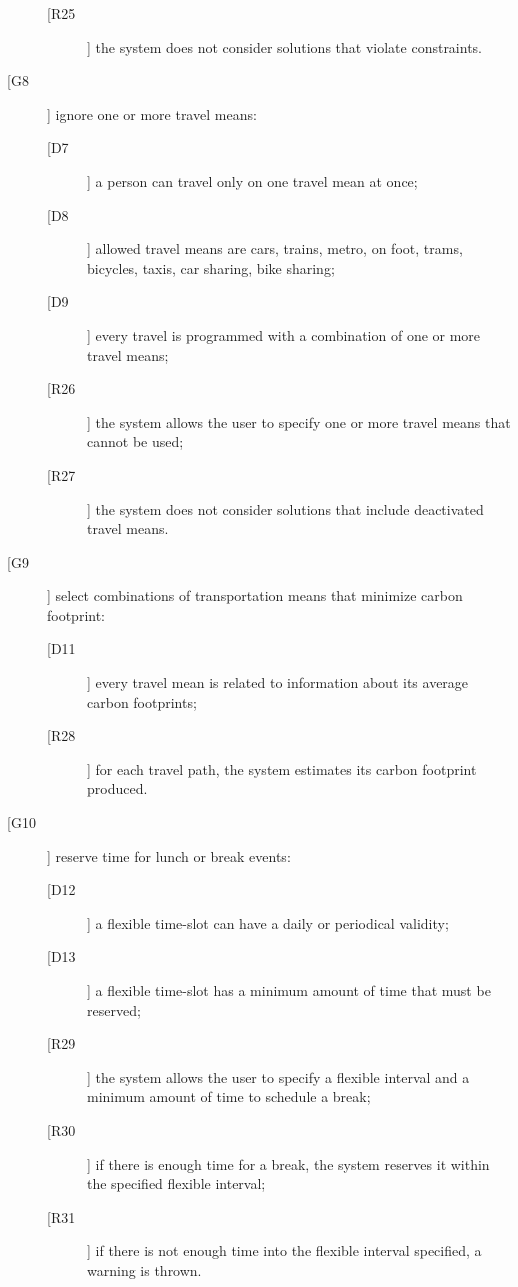 \begin{description}
\begin{description}
	\item[[R25]] the system does not consider solutions that violate constraints.
	\end{description}
\item[[G8]] ignore one or more travel means:
	\begin{description}
	\item[[D7]] a person can travel only on one travel mean at once; 
	\item[[D8]] allowed travel means are cars, trains, metro, on foot, trams, bicycles, taxis, car sharing, bike sharing;	
	\item[[D9]] every travel is programmed with a combination of one or more travel means;
	\newline
	\item[[R26]] the system allows the user to specify one or more travel means that cannot be used;
	\item[[R27]] the system does not consider solutions that include deactivated travel means.
	\end{description}
\item[[G9]] select combinations of transportation means that minimize carbon footprint:
	\begin{description}
	\item[[D11]] every travel mean is related to information about its average carbon footprints;
	\newline
	\item[[R28]] for each travel path, the system estimates its carbon footprint produced.
	\end{description}
\item[[G10]] reserve time for lunch or break events:
	\begin{description}
	\item[[D12]] a flexible time-slot can have a daily or periodical validity;
	\item[[D13]] a flexible time-slot has a minimum amount of time that must be reserved;
	\newline
	\item[[R29]] the system allows the user to specify a flexible interval and a minimum amount of time to schedule a break;
	\item[[R30]] if there is enough time for a break, the system reserves it within the specified flexible interval;
	\item[[R31]] if there is not enough time into the flexible interval specified, a warning is thrown.
	\end{description}

\end{description}
